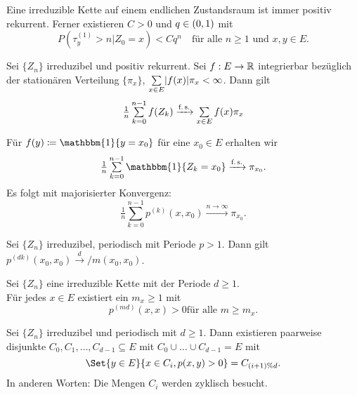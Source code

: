 \documentclass{cheat-sheet}
\newcommand{\ind}{\mathbbm{1}} %
\newcommand{\Defn}[1]{\textcolor{DefinitionColor}{#1}}
\begin{document}

\begin{satz}
  Eine irreduzible Kette auf einem endlichen Zustandsraum ist immer positiv rekurrent.
  Ferner existieren $C > 0$ und $q \in \left( 0, 1 \right)$ mit
  \[
    P(\tau_y^{(1)} > n | Z_0 = x) < C q^n
    \quad \text{für alle $n \geq 1$ und $x, y \in E$.}
  \]
\end{satz}

\begin{satz}
  Sei $\{ Z_n \}$ irreduzibel und positiv rekurrent.
  Sei $f : E \to \mathbb{R}$ integrierbar bezüglich der stationären Verteilung $\{ \pi_x \}$, \dh{} $\sum_{x \in E} \abs{f(x)} \pi_x < \infty$.
  Dann gilt
  \[
    \tfrac{1}{n} \sum_{k=0}^{n-1} f(Z_k) \xrightarrow{\text{f.\,s.}} \sum_{x \in E} f(x) \pi_x
  \]
\end{satz}

\begin{bsp}
  Für $f(y) \coloneqq \ind \{ y = x_0 \}$ für eine $x_0 \in E$ erhalten wir
  \[ \tfrac{1}{n} \sum_{k=0}^{n-1} \ind \{ Z_k = x_0 \} \xrightarrow{\text{f.\,s.}} \pi_{x_0}. \]
  Es folgt mit majorisierter Konvergenz:
  \[ \tfrac{1}{n} \sum_{k=0}^{n-1} p^{(k)}(x, x_0) \xrightarrow{n \to \infty} \pi_{x_0}. \]
\end{bsp}

\begin{bsp}
  Sei $\{ Z_n \}$ irreduzibel, periodisch mit Periode $p > 1$.
  Dann gilt
  $p^{(dk)}(x_0, x_0) \xrightarrow d / m(x_0, x_0)$.
\end{bsp}

\begin{lem}
  Sei $\{ Z_n \}$ eine irreduzible Kette mit der Periode $d \geq 1$. \\
  Für jedes $x \in E$ existiert ein $m_x \geq 1$ mit
  \[
    p^{(md)}(x, x) > 0
    \text{für alle $m \geq m_x$.}
  \]
\end{lem}


\begin{prop}
  Sei $\{ Z_n \}$ irreduzibel und periodisch mit $d \geq 1$.
  Dann existieren paarweise disjunkte $C_0, C_1, \ldots, C_{d-1} \subseteq E$ mit $C_0 \cup \ldots \cup C_{d-1} = E$ mit
  \[
    \Set{y \in E}{x \in C_i, p(x, y) > 0} = C_{(i+1) \% d}.
  \]
  In anderen Worten: Die Mengen $C_i$ werden zyklisch besucht.
\end{prop}
\end{document}
